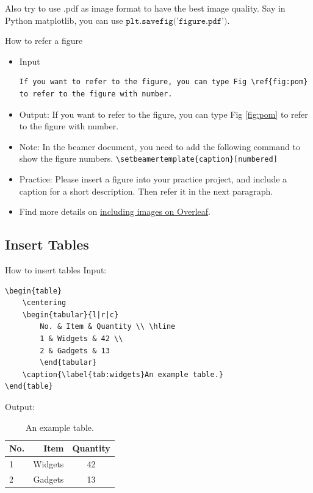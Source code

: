 \documentclass [xcolor=svgnames, t] {beamer}
\begin{document}
\begin{frame}
    Also try to use .pdf as image format to have the best image quality. Say in Python matplotlib, you can use $\texttt{plt.savefig('figure.pdf')}$.
\end{frame}

\begin{frame}[fragile]{How to refer a figure}
    \begin{itemize}
        \item Input
        \begin{lstlisting}
If you want to refer to the figure, you can type Fig \ref{fig:pom} to refer to the figure with number.\end{lstlisting}
        \item Output: If you want to refer to the figure, you can type Fig \ref{fig:pom} to refer to the figure with number.
        \item Note: In the beamer document, you need to add the following command to show the figure numbers. \verb|\setbeamertemplate{caption}[numbered]|
        \item Practice: Please insert a figure into your practice project, and include a caption for a short description. Then refer it in the next paragraph.
        \item Find more details on \href{https://www.overleaf.com/learn/how-to/Including_images_on_Overleaf}{including images on Overleaf}.
    \end{itemize}
\end{frame}

\subsection{Insert Tables}
\begin{frame}[fragile]{How to insert tables}
        Input:
        \begin{lstlisting}
\begin{table}
    \centering
    \begin{tabular}{l|r|c}
        No. & Item & Quantity \\ \hline
        1 & Widgets & 42 \\
        2 & Gadgets & 13
        \end{tabular}
    \caption{\label{tab:widgets}An example table.}
\end{table}
\end{lstlisting}
        Output:
        \begin{table}
            \centering
            \begin{tabular}{l|r|c}
                No. & Item    & Quantity \\
                \hline
                1   & Widgets & 42       \\
                2   & Gadgets & 13
            \end{tabular}
            \caption{\label{tab:widgets}An example table.}
        \end{table}
\end{frame}
\end{document}
